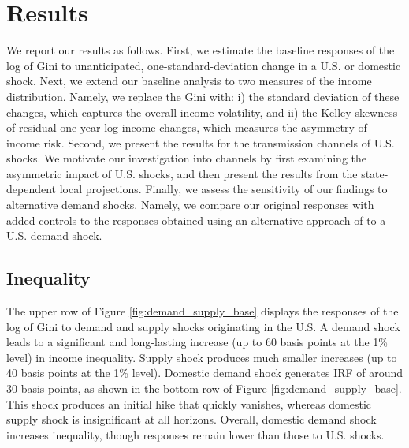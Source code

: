 \documentclass[12pt, a4paper]{article}
\begin{document}
\section{Results}
We report our results as follows. First, we estimate the baseline responses of the log of Gini to unanticipated, one-standard-deviation change in a U.S. or domestic shock. Next, we extend our baseline analysis to two measures of the income distribution. Namely, we replace the Gini with: i) the standard deviation of these changes, which captures the overall income volatility, and ii) the Kelley skewness of residual one-year log income changes, which measures the asymmetry of income risk. Second, we present the results for the transmission channels of U.S. shocks. We motivate our investigation into channels by first examining the asymmetric impact of U.S. shocks, and then present the results from the state-dependent local projections. Finally, we assess the sensitivity of our findings to alternative demand shocks. Namely, we compare our original responses with added controls to the responses obtained using an alternative approach of \textcite{bayoumi1992shocking} to a U.S. demand shock.


\subsection{Inequality}
The upper row of Figure \ref{fig:demand_supply_base} displays the responses of the log of Gini to demand and supply shocks originating in the U.S. A demand shock leads to a significant and long-lasting increase (up to 60 basis points at the 1\% level) in income inequality. Supply shock produces much smaller increases (up to 40 basis points at the 1\% level). Domestic demand shock generates IRF of around 30 basis points, as shown in the bottom row of Figure \ref{fig:demand_supply_base}. This shock produces an initial hike that quickly vanishes, whereas domestic supply shock is insignificant at all horizons. Overall, domestic demand shock increases inequality, though responses remain lower than those to U.S. shocks. 

\end{document}
